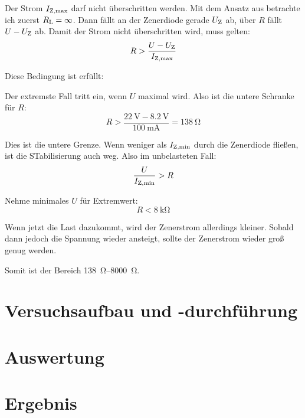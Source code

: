 Der Strom $I_\text{Z,max}$ darf nicht überschritten werden. Mit dem Ansatz aus 
\cite[§~15.1.3]{beuth/elementare_elektronik} betrachte ich zuerst $R_\text L =
\infty$. Dann fällt an der Zenerdiode gerade $U_\text Z$ ab, über $R$ fällt $U - U_\text Z$
ab. Damit der Strom nicht überschritten wird, muss gelten:
\[
	R > \frac{U - U_\text Z}{I_\text{Z,max}}
\]

Diese Bedingung ist erfüllt:

Der extremste Fall tritt ein, wenn $U$ maximal wird. Also ist die untere
Schranke für $R$:
\[
	R > \frac{\SI{22}\volt - \SI{8.2}\volt}{\SI{100}{\milli\ampere}}
	= \SI{138}\ohm
\]

Dies ist die untere Grenze. Wenn weniger als $I_\text{Z,min}$ durch die Zenerdiode
fließen, ist die STabilisierung auch weg. Also im unbelasteten Fall:
\[
	\frac U{I_\text{Z,min}} > R
\]

Nehme minimales $U$ für Extremwert:
\[
	R < \SI{8}{\kilo\ohm}
\]

Wenn jetzt die Last dazukommt, wird der Zenerstrom allerdings kleiner. Sobald
dann jedoch die Spannung wieder ansteigt, sollte der Zenerstrom wieder groß
genug werden.

Somit ist der Bereich \SIrange{138}{8000}{\ohm}.


\section{Versuchsaufbau und -durchführung}


\section{Auswertung}


\section{Ergebnis}

\IfFileExists{\bibliographyfile}{
	
}{}



